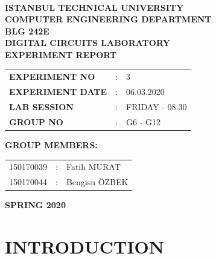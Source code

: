 \documentclass[pdftex,12pt,a4paper]{article}
\begin{document}
\begin{titlepage}
\begin{center}
\textbf{}\\
\textbf{\Large{ISTANBUL TECHNICAL UNIVERSITY}}\\
\vspace{0.5cm}
\textbf{\Large{COMPUTER ENGINEERING DEPARTMENT}}\\
\vspace{2cm}
\textbf{\Large{BLG 242E\\ DIGITAL CIRCUITS LABORATORY\\ EXPERIMENT REPORT}}\\
\vspace{2.8cm}
\begin{table}[ht]
\centering
\Large{
\begin{tabular}{lcl}
\textbf{EXPERIMENT NO}  & : & 3 \\
\textbf{EXPERIMENT DATE}  & : & 06.03.2020 \\
\textbf{LAB SESSION}  & : & FRIDAY - 08.30 \\
\textbf{GROUP NO}  & : & G6 - G12\\
\end{tabular}}
\end{table}
\vspace{1cm}
\textbf{\Large{GROUP MEMBERS:}}\\
\begin{table}[ht]
\centering
\Large{
\begin{tabular}{rcl}
150170039  & : & Fatih MURAT \\
150170044  & : & Bengisu ÖZBEK \\
\end{tabular}}
\end{table}
\vspace{2.8cm}
\textbf{\Large{SPRING 2020}}

\end{center}

\end{titlepage}

\thispagestyle{empty}
\setcounter{tocdepth}{4}
\tableofcontents
\clearpage

\setcounter{page}{1}

\section{INTRODUCTION}
\end{document}
